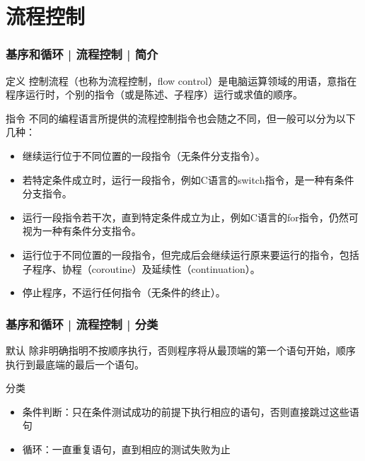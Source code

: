 \section{流程控制}
\begin{frame}
  \frametitle{基序和循环 | 流程控制 | 简介}
  \begin{block}{定义}
    控制流程（也称为流程控制，flow control）是电脑运算领域的用语，意指在程序运行时，个别的指令（或是陈述、子程序）运行或求值的顺序。
  \end{block}
  \pause
  \begin{block}{指令}
    不同的编程语言所提供的流程控制指令也会随之不同，但一般可以分为以下几种：
    \begin{itemize}
      \item 继续运行位于不同位置的一段指令（无条件分支指令）。
      \item 若特定条件成立时，运行一段指令，例如C语言的switch指令，是一种有条件分支指令。
      \item 运行一段指令若干次，直到特定条件成立为止，例如C语言的for指令，仍然可视为一种有条件分支指令。
      \item 运行位于不同位置的一段指令，但完成后会继续运行原来要运行的指令，包括子程序、协程（coroutine）及延续性（continuation）。
      \item 停止程序，不运行任何指令（无条件的终止）。
    \end{itemize}
  \end{block}
\end{frame}

\begin{frame}
  \frametitle{基序和循环 | 流程控制 | 分类}
  \begin{block}{默认}
    除非明确指明不按顺序执行，否则程序将从最顶端的第一个语句开始，顺序执行到最底端的最后一个语句。
  \end{block}
  \pause
  \begin{block}{\alert{分类}}
    \begin{itemize}
      \item 条件判断：只在条件测试成功的前提下执行相应的语句，否则直接跳过这些语句
      \item 循环：一直重复语句，直到相应的测试失败为止
    \end{itemize}
  \end{block}
\end{frame}


